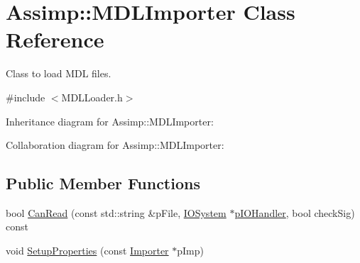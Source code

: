 \hypertarget{class_assimp_1_1_m_d_l_importer}{\section{Assimp\+:\+:M\+D\+L\+Importer Class Reference}
\label{class_assimp_1_1_m_d_l_importer}
}


Class to load M\+D\+L files.  




{\ttfamily \#include $<$M\+D\+L\+Loader.\+h$>$}



Inheritance diagram for Assimp\+:\+:M\+D\+L\+Importer\+:


Collaboration diagram for Assimp\+:\+:M\+D\+L\+Importer\+:
\subsection*{Public Member Functions}
\begin{DoxyCompactItemize}
\item 
bool \hyperlink{class_assimp_1_1_m_d_l_importer_a0d0c164cc792374e7dd888fa3b4ee96d}{Can\+Read} (const std\+::string \&p\+File, \hyperlink{class_assimp_1_1_i_o_system}{I\+O\+System} $\ast$\hyperlink{class_assimp_1_1_m_d_l_importer_a5799905b6ba533b0f066684b859bc3d5}{p\+I\+O\+Handler}, bool check\+Sig) const 
\item 
void \hyperlink{class_assimp_1_1_m_d_l_importer_a0815608887ab4132a1bac328007c4572}{Setup\+Properties} (const \hyperlink{class_assimp_1_1_importer}{Importer} $\ast$p\+Imp)
\end{DoxyCompactItemize}

